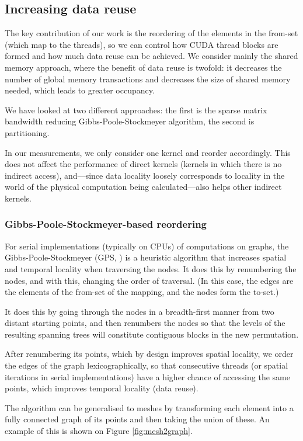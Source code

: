 \subsection{Increasing data reuse}\label{increasing-data-reuse}
The key contribution of our work is the reordering of the elements in the
from-set (which map to the threads), so we can control how CUDA thread blocks
are formed and how much data reuse can be achieved. We consider mainly the
shared memory approach, where the benefit of data reuse is twofold: it decreases
the number of global memory transactions and decreases the size of shared memory
needed, which leads to greater occupancy.

We have looked at two different approaches: the first is the sparse matrix
bandwidth reducing Gibbs-Poole-Stockmeyer algorithm, the second is partitioning.

In our measurements, we only consider one kernel and reorder accordingly. This
does not affect the performance of direct kernels (kernels in which there is no
indirect access), and---since data locality loosely corresponds to locality in
the world of the physical computation being calculated---also helps other
indirect kernels.

\subsubsection{Gibbs-Poole-Stockmeyer-based reordering}

For serial implementations (typically on CPUs) of computations on graphs, the
Gibbs-Poole-Stockmeyer (GPS, \cite{gps}) is a heuristic algorithm that increases
spatial and temporal locality when traversing the nodes. It does this by
renumbering the nodes, and with this, changing the order of traversal. (In this
case, the edges are the elements of the from-set of the mapping, and the nodes
form the to-set.)

It does this by going through the nodes in a breadth-first manner from two
distant starting points, and then renumbers the nodes so that the levels of the
resulting spanning trees will constitute contiguous blocks in the new
permutation.

After renumbering its points, which by design improves spatial locality, we
order the edges of the graph lexicographically, so that consecutive threads (or
spatial iterations in serial implementations) have a higher chance of accessing
the same points, which improves temporal locality (data reuse).

The algorithm can be generalised to meshes by transforming each element into a
fully connected graph of its points and then taking the union of these. An
example of this is shown on Figure \ref{fig:mesh2graph}.

